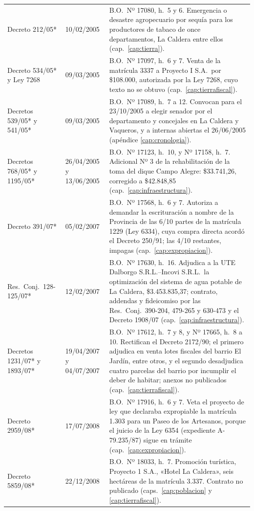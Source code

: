 \begin{longtable}{@{}p{3.2cm}p{1.9cm}p{7.9cm}@{}}
Decreto 212/05* & 10/02/2005 & B.O.\ Nº 17080, h.\ 5 y 6. Emergencia o desastre agropecuario por sequía para los productores de tabaco de once departamentos, La Caldera entre ellos (cap.\ \ref{cap:tierra}). \\
Decreto 534/05* y Ley 7268 & 09/03/2005 & B.O.\ Nº 17097, h.\ 6 y 7. Venta de la matrícula 3337 a Proyecto I S.A.\ por \$108.000, autorizada por la Ley 7268, cuyo texto no se obtuvo (cap.\ \ref{cap:tierrafiscal}). \\
Decretos 539/05* y 541/05* & 09/03/2005 & B.O.\ Nº 17089, h.\ 7 a 12. Convocan para el 23/10/2005 a elegir senador por el departamento y concejales en La Caldera y Vaqueros, y a internas abiertas el 26/06/2005 (apéndice \ref{cap:cronologia}). \\
Decretos 768/05* y 1195/05* & 26/04/2005 y 13/06/2005 & B.O.\ Nº 17123, h.\ 10, y Nº 17158, h.\ 7. Adicional Nº 3 de la rehabilitación de la toma del dique Campo Alegre: \$33.741,26, corregido a \$42.848,85 (cap.\ \ref{cap:infraestructura}). \\
Decreto 391/07* & 05/02/2007 & B.O.\ Nº 17568, h.\ 6 y 7. Autoriza a demandar la escrituración a nombre de la Provincia de las 6/10 partes de la matrícula 1229 (Ley 6334), cuya compra directa acordó el Decreto 250/91; las 4/10 restantes, impagas (cap.\ \ref{cap:expropiacion}). \\
Res.\ Conj.\ 128-125/07* & 12/02/2007 & B.O.\ Nº 17630, h.\ 16. Adjudica a la UTE Dalborgo S.R.L.--Incovi S.R.L.\ la optimización del sistema de agua potable de La Caldera, \$3.453.835,37; contrato, addendas y fideicomiso por las Res.\ Conj.\ 390-204, 479-265 y 630-473 y el Decreto 1908/07 (cap.\ \ref{cap:infraestructura}). \\
Decretos 1231/07* y 1893/07* & 19/04/2007 y 04/07/2007 & B.O.\ Nº 17612, h.\ 7 y 8, y Nº 17665, h.\ 8 a 10. Rectifican el Decreto 2172/90; el primero adjudica en venta lotes fiscales del barrio El Jardín, entre otros, y el segundo desadjudica cuatro parcelas del barrio por incumplir el deber de habitar; anexos no publicados (cap.\ \ref{cap:tierrafiscal}). \\
Decreto 2959/08* & 17/07/2008 & B.O.\ Nº 17916, h.\ 6 y 7. Veta el proyecto de ley que declaraba expropiable la matrícula 1.303 para un Paseo de los Artesanos, porque el juicio de la Ley 6354 (expediente A-79.235/87) sigue en trámite (cap.\ \ref{cap:expropiacion}). \\
Decreto 5859/08* & 22/12/2008 & B.O.\ Nº 18033, h.\ 7. Promoción turística, Proyecto 1 S.A., «Hotel La Caldera», seis hectáreas de la matrícula 3.337. Contrato no publicado (caps.\ \ref{cap:poblacion} y \ref{cap:tierrafiscal}). \\

\end{longtable}
